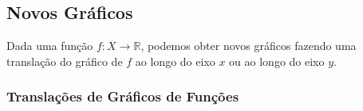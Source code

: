 \subsection*{Novos Gráficos}
\begin{tcolorbox}
Dada uma função $f:X\longrightarrow \mathbb{R}$, podemos obter novos gráficos fazendo uma translação do gráfico de $f$ ao longo do eixo $x$ ou ao longo do eixo $y$.

\subsubsection*{Translações de Gráficos de Funções}

\begin{figure}[H]
\centering
\subfigure{
    }
    \qquad
\subfigure{
    }
\end{figure}
\end{tcolorbox}
